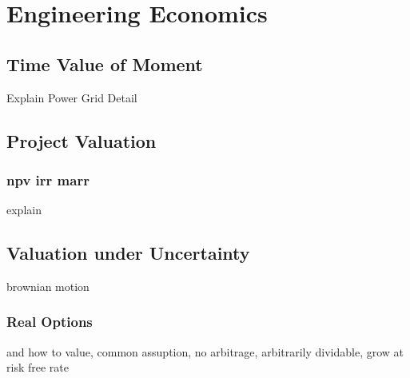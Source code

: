 
\chapter{Engineering Economics}




\section{Time Value of Moment}
Explain Power Grid Detail
\section{Project Valuation}
\subsection{npv irr marr}
explain
\section{Valuation under Uncertainty}
brownian motion
\subsection{Real Options}
and how to value, common assuption, no arbitrage, arbitrarily dividable, grow at risk free rate